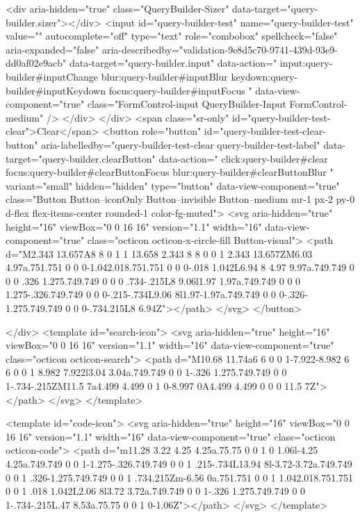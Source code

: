             <div aria-hidden="true" class="QueryBuilder-Sizer" data-target="query-builder.sizer"></div>
            <input id="query-builder-test" name="query-builder-test" value="" autocomplete="off" type="text" role="combobox" spellcheck="false" aria-expanded="false" aria-describedby="validation-9e8d5c70-9741-439d-93e9-dd0af02e9acb" data-target="query-builder.input" data-action="
          input:query-builder#inputChange
          blur:query-builder#inputBlur
          keydown:query-builder#inputKeydown
          focus:query-builder#inputFocus
        " data-view-component="true" class="FormControl-input QueryBuilder-Input FormControl-medium" />
          </div>
        </div>
          <span class="sr-only" id="query-builder-test-clear">Clear</span>
          <button role="button" id="query-builder-test-clear-button" aria-labelledby="query-builder-test-clear query-builder-test-label" data-target="query-builder.clearButton" data-action="
                click:query-builder#clear
                focus:query-builder#clearButtonFocus
                blur:query-builder#clearButtonBlur
              " variant="small" hidden="hidden" type="button" data-view-component="true" class="Button Button--iconOnly Button--invisible Button--medium mr-1 px-2 py-0 d-flex flex-items-center rounded-1 color-fg-muted">  <svg aria-hidden="true" height="16" viewBox="0 0 16 16" version="1.1" width="16" data-view-component="true" class="octicon octicon-x-circle-fill Button-visual">
    <path d="M2.343 13.657A8 8 0 1 1 13.658 2.343 8 8 0 0 1 2.343 13.657ZM6.03 4.97a.751.751 0 0 0-1.042.018.751.751 0 0 0-.018 1.042L6.94 8 4.97 9.97a.749.749 0 0 0 .326 1.275.749.749 0 0 0 .734-.215L8 9.06l1.97 1.97a.749.749 0 0 0 1.275-.326.749.749 0 0 0-.215-.734L9.06 8l1.97-1.97a.749.749 0 0 0-.326-1.275.749.749 0 0 0-.734.215L8 6.94Z"></path>
</svg>
</button>

      </div>
      <template id="search-icon">
  <svg aria-hidden="true" height="16" viewBox="0 0 16 16" version="1.1" width="16" data-view-component="true" class="octicon octicon-search">
    <path d="M10.68 11.74a6 6 0 0 1-7.922-8.982 6 6 0 0 1 8.982 7.922l3.04 3.04a.749.749 0 0 1-.326 1.275.749.749 0 0 1-.734-.215ZM11.5 7a4.499 4.499 0 1 0-8.997 0A4.499 4.499 0 0 0 11.5 7Z"></path>
</svg>
</template>

<template id="code-icon">
  <svg aria-hidden="true" height="16" viewBox="0 0 16 16" version="1.1" width="16" data-view-component="true" class="octicon octicon-code">
    <path d="m11.28 3.22 4.25 4.25a.75.75 0 0 1 0 1.06l-4.25 4.25a.749.749 0 0 1-1.275-.326.749.749 0 0 1 .215-.734L13.94 8l-3.72-3.72a.749.749 0 0 1 .326-1.275.749.749 0 0 1 .734.215Zm-6.56 0a.751.751 0 0 1 1.042.018.751.751 0 0 1 .018 1.042L2.06 8l3.72 3.72a.749.749 0 0 1-.326 1.275.749.749 0 0 1-.734-.215L.47 8.53a.75.75 0 0 1 0-1.06Z"></path>
</svg>
</template>


